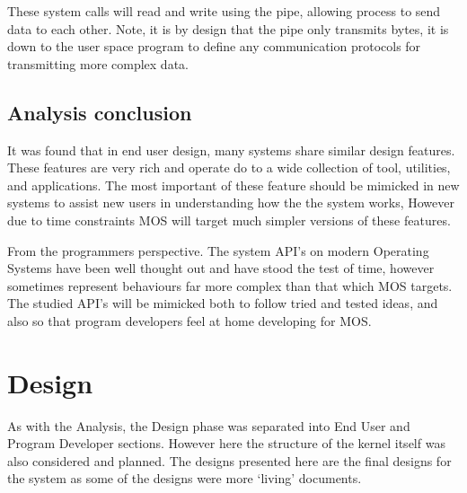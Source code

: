 \documentclass[a4paper]{report}
\begin{document}
These system calls will read and write using the pipe, allowing process to send data to each other. Note, it is by design that the pipe only transmits bytes, it is down to the user space program to define any communication protocols for transmitting more complex data.

\section{Analysis conclusion}

It was found that in end user design, many systems share similar design features. These features are very rich and operate do to a wide collection of tool, utilities, and applications. The most important of these feature should be mimicked in new systems to assist new users in understanding how the the system works, However due to time constraints MOS will target much simpler versions of these features.

From the programmers perspective. The system API's on modern Operating Systems have been well thought out and have stood the test of time, however sometimes represent behaviours far more complex than that which MOS targets. The studied API's will be mimicked both to follow tried and tested ideas, and also so that program developers feel at home developing for MOS.


































\chapter{Design}

As with the Analysis, the Design phase was separated into End User and Program Developer sections. However here the structure of the kernel itself was also considered and planned. The designs presented here are the final designs for the system as some of the designs were more `living' documents.
\end{document}
